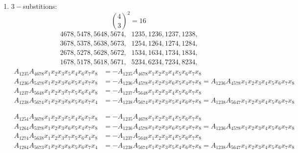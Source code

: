 \documentclass[aps, preprint]{revtex4}
\begin{document}
\begin{enumerate}
\item $3 -$substitions:
\begin{equation}\binom{4}{3}^{2} =16
\end{equation}
\begin{equation}\begin{array}{c}4678,5478,5648,5674\text{,} \\
3678,5378,5638,5673\text{,} \\
2678,5278,5628,5672\text{,} \\
1678,5178,5618,5671\text{,}\end{array} \begin{array}{c}1235,1236,1237,1238\text{,} \\
1254,1264,1274,1284\text{,} \\
1534,1634,1734,1834\text{,} \\
5234,6234,7234,8234\text{,}\end{array}
\end{equation}
\begin{align}A_{1 2 3 5} A_{4 6 7 8} x_{1} x_{2} x_{3} x_{5} x_{4} x_{6} x_{7} x_{8} &  = -A_{1 2 3 5} A_{4 6 7 8} x_{1} x_{2} x_{3} x_{4} x_{5} x_{6} x_{7} x_{8} \\
A_{1 2 3 6} A_{5 4 7 8} x_{1} x_{2} x_{3} x_{6} x_{5} x_{4} x_{7} x_{8} &  = -A_{1 2 3 6} A_{4 5 7 8} x_{1} x_{2} x_{3} x_{6} x_{5} x_{4} x_{7} x_{8} =A_{1 2 3 6} A_{4 5 7 8} x_{1} x_{2} x_{3} x_{4} x_{5} x_{6} x_{7} x_{8} \\
A_{1 2 3 7} A_{5 6 4 8} x_{1} x_{2} x_{3} x_{7} x_{5} x_{6} x_{4} x_{8} &  = -A_{1 2 3 7} A_{5 6 4 8} x_{1} x_{2} x_{3} x_{4} x_{5} x_{6} x_{7} x_{8} \\
A_{1 2 3 8} A_{5 6 7 4} x_{1} x_{2} x_{3} x_{8} x_{5} x_{6} x_{7} x_{4} &  = -A_{1 2 3 8} A_{5 6 7 4} x_{1} x_{2} x_{3} x_{5} x_{4} x_{6} x_{7} x_{8} =A_{1 2 3 8} A_{5 6 4 7} x_{1} x_{2} x_{3} x_{4} x_{5} x_{6} x_{7} x_{8}\end{align}


\begin{align}A_{1 2 5 4} A_{3 6 7 8} x_{1} x_{2} x_{3} x_{5} x_{4} x_{6} x_{7} x_{8} &  = -A_{1 2 3 5} A_{4 6 7 8} x_{1} x_{2} x_{3} x_{4} x_{5} x_{6} x_{7} x_{8} \\
A_{1 2 6 4} A_{5 3 7 8} x_{1} x_{2} x_{3} x_{6} x_{5} x_{4} x_{7} x_{8} &  = -A_{1 2 3 6} A_{4 5 7 8} x_{1} x_{2} x_{3} x_{6} x_{5} x_{4} x_{7} x_{8} =A_{1 2 3 6} A_{4 5 7 8} x_{1} x_{2} x_{3} x_{4} x_{5} x_{6} x_{7} x_{8} \\
A_{1 2 7 4} A_{5 6 3 8} x_{1} x_{2} x_{3} x_{7} x_{5} x_{6} x_{4} x_{8} &  = -A_{1 2 3 7} A_{5 6 4 8} x_{1} x_{2} x_{3} x_{4} x_{5} x_{6} x_{7} x_{8} \\
A_{1 2 8 4} A_{5 6 7 3} x_{1} x_{2} x_{3} x_{8} x_{5} x_{6} x_{7} x_{4} &  = -A_{1 2 3 8} A_{5 6 7 4} x_{1} x_{2} x_{3} x_{5} x_{4} x_{6} x_{7} x_{8} =A_{1 2 3 8} A_{5 6 4 7} x_{1} x_{2} x_{3} x_{4} x_{5} x_{6} x_{7} x_{8}\end{align}



\end{enumerate}
\end{document}
